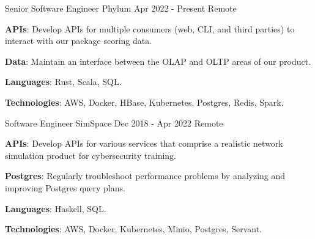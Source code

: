 

\begin{cventries}

  \cventry
    {Senior Software Engineer}
    {Phylum}
    {Apr 2022 - Present}
    {Remote}
    {
      \begin{cvitems}
        \item {\color{graytext}\textbf{APIs}}: Develop APIs for multiple
          consumers (web, CLI, and third parties) to interact with our package
          scoring data.
        \item {\color{graytext}\textbf{Data}}: Maintain an interface between the
          OLAP and OLTP areas of our product.
        \item {\color{graytext}\textbf{Languages}}: Rust, Scala, SQL.
        \item {\color{graytext}\textbf{Technologies}}:
          AWS, Docker, HBase, Kubernetes, Postgres, Redis, Spark.
      \end{cvitems}
    }


  \longdatecventry
    {Software Engineer}
    {SimSpace}
    {Dec 2018 - Apr 2022}
    {Remote}
    {
      \begin{cvitems}
        \item {\color{graytext}\textbf{APIs}}: Develop APIs for various services
          that comprise a realistic network simulation product for cybersecurity
          training.
        \item {\color{graytext}\textbf{Postgres}}: Regularly troubleshoot
          performance problems by analyzing and improving Postgres query plans.
        \item {\color{graytext}\textbf{Languages}}: Haskell, SQL.
        \item {\color{graytext}\textbf{Technologies}}: AWS, Docker, Kubernetes,
          Minio, Postgres, Servant.
      \end{cvitems}
    }



\end{cventries}
